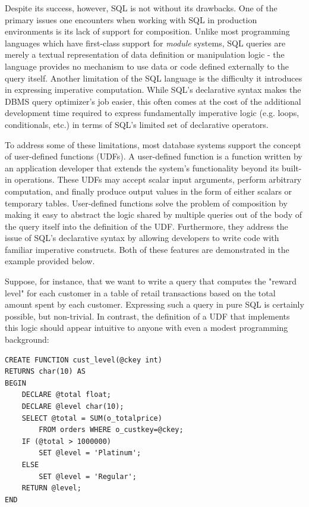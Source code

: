 \documentclass{vldb}
\begin{document}
Despite its success, however, SQL is not without its drawbacks. One of the primary issues one encounters when working with SQL in production environments is its lack of support for composition. Unlike most programming languages which have first-class support for \textit{module} systems, SQL queries are merely a textual representation of data definition or manipulation logic - the language provides no mechanism to use data or code defined externally to the query itself. Another limitation of the SQL language is the difficulty it introduces in expressing imperative computation. While SQL's declarative syntax makes the DBMS query optimizer's job easier, this often comes at the cost of the additional development time required to express fundamentally imperative logic (e.g. loops, conditionals, etc.) in terms of SQL's limited set of declarative operators.

To address some of these limitations, most database systems support the concept of user-defined functions (UDFs). A user-defined function is a function written by an application developer that extends the system's functionality beyond its built-in operations. These UDFs may accept scalar input arguments, perform arbitrary computation, and finally produce output values in the form of either scalars or temporary tables. User-defined functions solve the problem of composition by making it easy to abstract the logic shared by multiple queries out of the body of the query itself into the definition of the UDF. Furthermore, they address the issue of SQL's declarative syntax by allowing developers to write code with familiar imperative constructs. Both of these features are demonstrated in the example provided below.

Suppose, for instance, that we want to write a query that computes the "reward level" for each customer in a table of retail transactions based on the total amount spent by each customer. Expressing such a query in pure SQL is certainly possible, but non-trivial. In contrast, the definition of a UDF that implements this logic should appear intuitive to anyone with even a modest programming background:

\begin{lstlisting}
CREATE FUNCTION cust_level(@ckey int)
RETURNS char(10) AS
BEGIN
    DECLARE @total float;
    DECLARE @level char(10);
    SELECT @total = SUM(o_totalprice)
        FROM orders WHERE o_custkey=@ckey;
    IF (@total > 1000000)
        SET @level = 'Platinum';
    ELSE
        SET @level = 'Regular';
    RETURN @level;
END    
\end{lstlisting}
\end{document}
